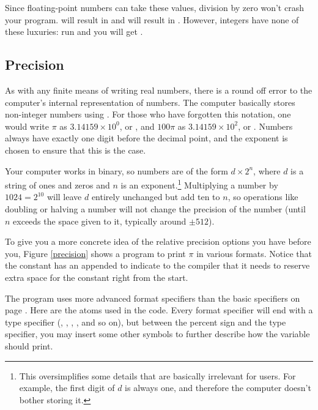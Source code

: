 Since floating-point numbers can take these values, division by zero
won't crash your program.  will result in
 and  will result in . However, integers have none of these luxuries: run  and you will get .

\subsection{Precision} 
As with any finite means of writing real numbers,
there is a round off error to the computer's internal representation of
numbers. The computer basically stores non-integer numbers using
. For those who have forgotten this notation, one
would write  $\pi$ as $3.14159 \times 10^0$, or , 
and $100\pi$ as $3.14159 \times 10^2$, or . 
Numbers always have exactly one digit before the decimal point, and the
exponent is chosen to ensure that this is the case.

Your computer works in binary, so numbers are of the form $d \times
2^n$, where $d$ is a string of ones and zeros and $n$ is an
exponent.\footnote{This oversimplifies some details that are
basically irrelevant for users. For example, the first digit of $d$
is always one, and therefore the computer doesn't bother storing it.}
Multiplying a number by $1024=2^{10}$ will leave $d$ entirely unchanged
but add ten to $n$, so operations like doubling or halving a number
will not change the precision of the number (until $n$ exceeds the space
given to it, typically around $\pm 512$).

To give you a more concrete idea of the relative precision options
you have before you, Figure \ref{precision} shows a program to print $\pi$ in various
formats. Notice that the constant has an  appended to indicate
to the compiler that it needs to reserve extra space for the constant
right from the start. 

The program uses more advanced  format specifiers than the basic specifiers
on page \pageref{printf}. Here are the atoms used in the code.  Every
format specifier will end with a type specifier (, , ,
, and so on), but between the percent sign and the type specifier,
you may insert some other symbols to further describe how the variable
should print.

\begin{center}
\label{printftwo}
\end{center}

